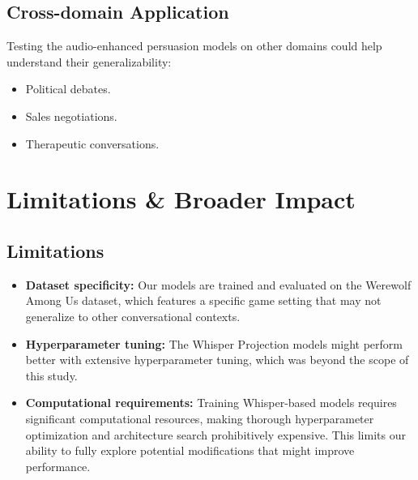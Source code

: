 \documentclass{article}
\begin{document}
\subsection{Cross-domain Application}
Testing the audio-enhanced persuasion models on other domains could help understand their generalizability:
\begin{itemize}
    \item Political debates.
    \item Sales negotiations.
    \item Therapeutic conversations.
\end{itemize}

\section{Limitations \& Broader Impact}
\subsection{Limitations}
\begin{itemize}
    \item \textbf{Dataset specificity:} Our models are trained and evaluated on the Werewolf Among Us dataset, which features a specific game setting that may not generalize to other conversational contexts.
    
    \item \textbf{Hyperparameter tuning:} The Whisper Projection models might perform better with extensive hyperparameter tuning, which was beyond the scope of this study.
    
    \item \textbf{Computational requirements:} Training Whisper-based models requires significant computational resources, making thorough hyperparameter optimization and architecture search prohibitively expensive. This limits our ability to fully explore potential modifications that might improve performance.
\end{itemize}
\end{document}

